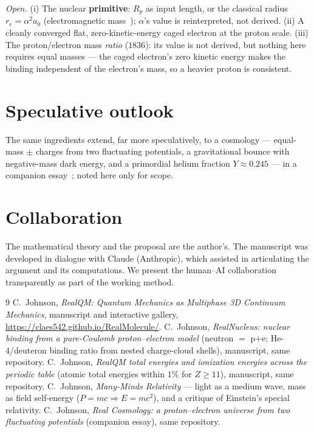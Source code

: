 \documentclass[11pt]{article}
\begin{document}
\medskip\noindent\emph{Open.} (i) The nuclear \textbf{primitive}: $R_p$ as input length, or the classical
radius $r_e=\alpha^2a_0$ (electromagnetic mass~\cite{mmr}); $\alpha$'s value is reinterpreted, not derived.
(ii) A cleanly converged flat, zero-kinetic-energy caged electron at the proton scale. (iii) The proton/electron
mass \emph{ratio} ($1836$): its value is not derived, but nothing here requires equal masses --- the caged
electron's zero kinetic energy makes the binding independent of the electron's mass, so a heavier proton is
consistent.

\section{Speculative outlook}\label{sec:outlook}
The same ingredients extend, far more speculatively, to a cosmology --- equal-mass $\pm$ charges from two
fluctuating potentials, a gravitational bounce with negative-mass dark energy, and a primordial helium
fraction $Y\approx0.245$ --- in a companion essay~\cite{realcos}; noted here only for scope.

\section{Collaboration}\label{sec:collab}
The mathematical theory and the proposal are the author's. The manuscript was developed in dialogue with
Claude (Anthropic), which assisted in articulating the argument and its computations. We present the
human--AI collaboration transparently as part of the working method.

\begin{thebibliography}{9}
 C.\ Johnson, \emph{RealQM: Quantum Mechanics as Multiphase 3D Continuum Mechanics},
manuscript and interactive gallery, \url{https://claes542.github.io/RealMolecule/}.
 C.\ Johnson, \emph{RealNucleus: nuclear binding from a pure-Coulomb proton--electron
model} (neutron $=$ p$+$e; He-4/deuteron binding ratio from nested charge-cloud shells), manuscript, same
repository.
 C.\ Johnson, \emph{RealQM total energies and ionization energies across the periodic table}
(atomic total energies within $1\%$ for $Z\ge11$), manuscript, same repository.
 C.\ Johnson, \emph{Many-Minds Relativity} --- light as a medium wave, mass as field
self-energy ($P=mc\Rightarrow E=mc^2$), and a critique of Einstein's special relativity.
 C.\ Johnson, \emph{Real Cosmology: a proton--electron universe from two fluctuating
potentials} (companion essay), same repository.
\end{thebibliography}
\end{document}
